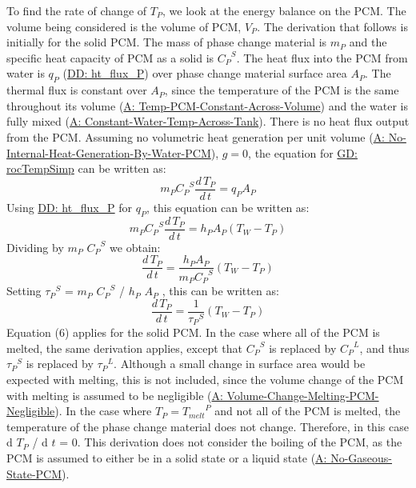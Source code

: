 \documentclass[12pt]{article}
\begin{document}
To find the rate of change of ${T_{P}}$, we look at the energy balance on the PCM. The volume being considered is the volume of PCM, ${V_{P}}$. The derivation that follows is initially for the solid PCM. The mass of phase change material is ${m_{P}}$ and the specific heat capacity of PCM as a solid is ${{C_{P}}^{S}}$. The heat flux into the PCM from water is ${q_{P}}$ (\hyperref[DD:ht.flux.P]{DD: ht\_flux\_P}) over phase change material surface area ${A_{P}}$. The thermal flux is constant over ${A_{P}}$, since the temperature of the PCM is the same throughout its volume (\hyperref[assumpTPCAV]{A: Temp-PCM-Constant-Across-Volume}) and the water is fully mixed (\hyperref[assumpCWTAT]{A: Constant-Water-Temp-Across-Tank}). There is no heat flux output from the PCM. Assuming no volumetric heat generation per unit volume (\hyperref[assumpNIHGBWP]{A: No-Internal-Heat-Generation-By-Water-PCM}), $g=0$, the equation for \hyperref[GD:rocTempSimp]{GD: rocTempSimp} can be written as:
\begin{displaymath}
{m_{P}} {{C_{P}}^{S}} \frac{d\,{T_{P}}}{d\,t}={q_{P}} {A_{P}}
\end{displaymath}
Using \hyperref[DD:ht.flux.P]{DD: ht\_flux\_P} for ${q_{P}}$, this equation can be written as:
\begin{displaymath}
{m_{P}} {{C_{P}}^{S}} \frac{d\,{T_{P}}}{d\,t}={h_{P}} {A_{P}} \left({T_{W}}-{T_{P}}\right)
\end{displaymath}
Dividing by ${m_{P}}$ ${{C_{P}}^{S}}$ we obtain:
\begin{displaymath}
\frac{d\,{T_{P}}}{d\,t}=\frac{{h_{P}} {A_{P}}}{{m_{P}} {{C_{P}}^{S}}} \left({T_{W}}-{T_{P}}\right)
\end{displaymath}
Setting ${{τ_{P}}^{S}}$ = ${m_{P}}$ ${{C_{P}}^{S}}$ / ${h_{P}}$ ${A_{P}}$ , this can be written as:
\begin{displaymath}
\frac{d\,{T_{P}}}{d\,t}=\frac{1}{{{τ_{P}}^{S}}} \left({T_{W}}-{T_{P}}\right)
\end{displaymath}
Equation (6) applies for the solid PCM. In the case where all of the PCM is melted, the same derivation applies, except that ${{C_{P}}^{S}}$ is replaced by ${{C_{P}}^{L}}$, and thus ${{τ_{P}}^{S}}$ is replaced by ${{τ_{P}}^{L}}$. Although a small change in surface area would be expected with melting, this is not included, since the volume change of the PCM with melting is assumed to be negligible (\hyperref[assumpVCMPN]{A: Volume-Change-Melting-PCM-Negligible}).
In the case where ${T_{P}}={{T_{melt}}^{P}}$ and not all of the PCM is melted, the temperature of the phase change material does not change. Therefore, in this case d ${T_{P}}$ / d $t$ = 0.
This derivation does not consider the boiling of the PCM, as the PCM is assumed to either be in a solid state or a liquid state (\hyperref[assumpNGSP]{A: No-Gaseous-State-PCM}).
\par~
\end{document}
